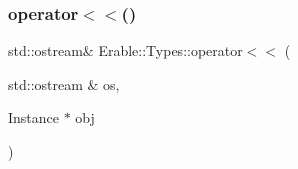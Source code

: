 \mbox{\label{namespace_erable_1_1_types_a5b9795a5d66a21616d567bd50dba567f}} 
\subsubsection{\texorpdfstring{operator$<$$<$()}{operator<<()}\hspace{0.1cm}{\footnotesize\ttfamily [2/2]}}
{\footnotesize\ttfamily std\+::ostream\& Erable\+::\+Types\+::operator$<$$<$ (\begin{DoxyParamCaption}\item[{std\+::ostream \&}]{os,  }\item[{Instance $\ast$}]{obj }\end{DoxyParamCaption})}

